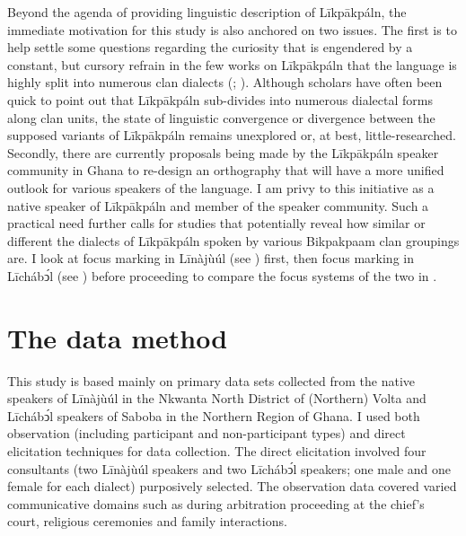\documentclass[output=paper,colorlinks,citecolor=brown]{langscibook}
\begin{document}
Beyond the agenda of providing linguistic description of Līkpākpáln, the immediate motivation for this study is also anchored on two issues. The first is to help settle some questions regarding the curiosity that is engendered by a constant, but cursory refrain in the few works on Līkpākpáln that the language is highly split into numerous clan dialects (\citealt[182]{Schwarz2009}; \citealt[107]{Hasselbring2006}). Although scholars have often been quick to point out that Līkpākpáln sub-divides into numerous dialectal forms along clan units, the state of linguistic convergence or divergence between the supposed variants of Līkpākpáln remains unexplored or, at best, little-researched. Secondly, there are currently proposals being made by the Līkpākpáln speaker community in Ghana to re-design an orthography that will have a more unified outlook for various speakers of the language. I am privy to this initiative as a native speaker of Līkpākpáln and member of the speaker community. Such a practical need further calls for studies that potentially reveal how similar or different the dialects of Līkpākpáln spoken by various Bikpakpaam clan groupings are. I look at focus marking in Līnàjùúl (see ) first, then focus marking in Līchábͻ́l (see ) before proceeding to compare the focus systems of the two in .

\section{The data method}\label{sec:bisilki:4}

This study is based mainly on primary data sets collected from the native speakers of Līnàjùúl in the Nkwanta North District of (Northern) Volta and Līchábͻ́l speakers of Saboba in the Northern Region of Ghana. I used both observation (including participant and non-participant types) and direct elicitation techniques for data collection. The direct elicitation involved four consultants (two Līnàjùúl speakers and two Līchábͻ́l speakers; one male and one female for each dialect) purposively selected. The observation data covered varied communicative domains such as during arbitration proceeding at the chief’s court, religious ceremonies and family interactions.
\end{document}
